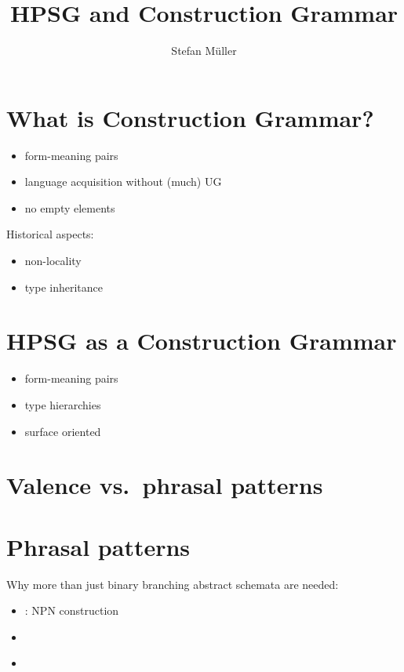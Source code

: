 \documentclass[output=paper]{langsci/langscibook}
\author{Stefan Müller\affiliation{Humboldt-Universität zu Berlin}}
\title{HPSG and Construction Grammar}
\begin{document}
\section{What is Construction Grammar?}

\citet{Goldberg96a,Goldberg2006a,Michaelis2012a}

\begin{itemize}
\item form-meaning pairs
\item language acquisition without (much) UG
\item no empty elements
\end{itemize}

Historical aspects:
\begin{itemize}
\item non-locality \citep{FKoC88a}
\item type inheritance \citet{KF99a,Sag97a}
\end{itemize}

\section{HPSG as a Construction Grammar}

\begin{itemize}
\item form-meaning pairs
\item type hierarchies
\item surface oriented
\end{itemize}

\section{Valence vs.\ phrasal patterns}

\citet{Goldberg96a,Goldberg2006a,GJ2004a}
 
\citet{Mueller2006d,MWArgSt,MuellerLFGphrasal}

\section{Phrasal patterns}

Why more than just binary branching abstract schemata are needed:
\begin{itemize}
\item \citet{Jackendoff2008a}: NPN construction
\item \citet{Jacobs2008a}
\item \citet[Section~21.10.1]{MuellerGT-Eng1}
\end{itemize}
\end{document}
